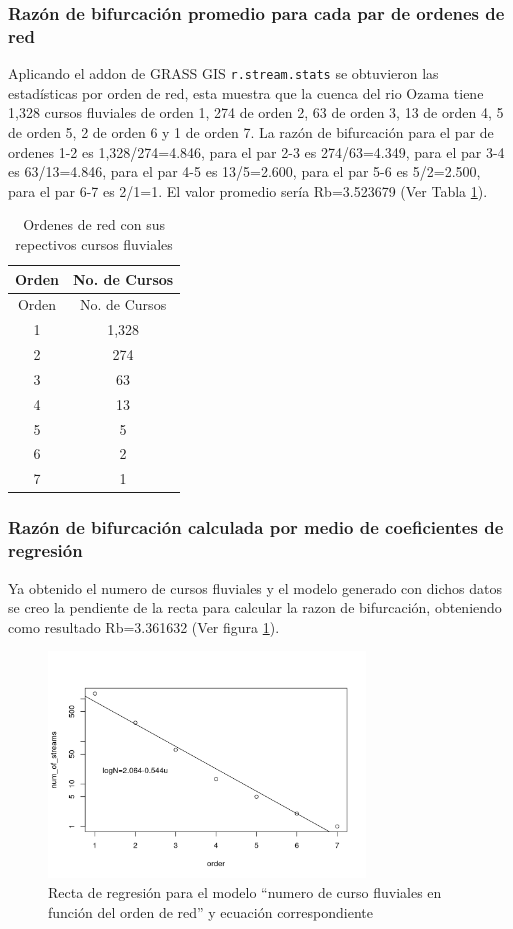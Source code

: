 \documentclass[11pt,]{article}
\begin{document}
\subsubsection{Razón de bifurcación promedio para cada par de ordenes de
red}\label{razuxf3n-de-bifurcaciuxf3n-promedio-para-cada-par-de-ordenes-de-red}

Aplicando el addon de GRASS GIS \texttt{r.stream.stats} se obtuvieron
las estadísticas por orden de red, esta muestra que la cuenca del rio
Ozama tiene 1,328 cursos fluviales de orden 1, 274 de orden 2, 63 de
orden 3, 13 de orden 4, 5 de orden 5, 2 de orden 6 y 1 de orden 7. La
razón de bifurcación para el par de ordenes 1-2 es 1,328/274=4.846, para
el par 2-3 es 274/63=4.349, para el par 3-4 es 63/13=4.846, para el par
4-5 es 13/5=2.600, para el par 5-6 es 5/2=2.500, para el par 6-7 es
2/1=1. El valor promedio sería Rb=3.523679 (Ver Tabla \ref{tab:tabla}).

\newpage   

\begin{longtable}[]{@{}cc@{}}
\caption{Ordenes de red con sus repectivos cursos
fluviales\label{tab:tabla}}\tabularnewline
\toprule
Orden & No. de Cursos\tabularnewline
\midrule
\endfirsthead
\toprule
Orden & No. de Cursos\tabularnewline
\midrule
\endhead
1 & 1,328\tabularnewline
2 & 274\tabularnewline
3 & 63\tabularnewline
4 & 13\tabularnewline
5 & 5\tabularnewline
6 & 2\tabularnewline
7 & 1\tabularnewline
\bottomrule
\end{longtable}

\subsubsection{Razón de bifurcación calculada por medio de coeficientes
de
regresión}\label{razuxf3n-de-bifurcaciuxf3n-calculada-por-medio-de-coeficientes-de-regresiuxf3n}

Ya obtenido el numero de cursos fluviales y el modelo generado con
dichos datos se creo la pendiente de la recta para calcular la razon de
bifurcación, obteniendo como resultado Rb=3.361632 (Ver figura
\ref{fig:Rb_R}).

\begin{figure}
\centering
\includegraphics[width=0.75000\textwidth]{Productos Generados/Orden_red_regresion.png}
\caption{\label{fig:Rb_R} Recta de regresión para el modelo ``numero de
curso fluviales en función del orden de red'' y ecuación
correspondiente}
\end{figure}
\end{document}
